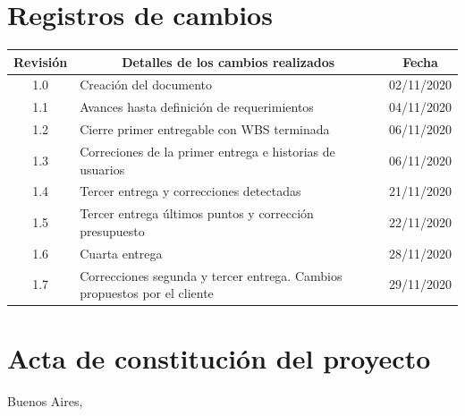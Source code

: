 \documentclass[11pt]{charter}
\begin{document}
\maketitle
\thispagestyle{empty}
\pagebreak


\thispagestyle{empty}
{\setlength{\parskip}{0pt}
\tableofcontents{}
}
\pagebreak


\section{Registros de cambios}
\label{sec:registro}


\begin{table}[ht]
\label{tab:registro}
\centering
\begin{tabularx}{\linewidth}{@{}|c|X|c|@{}}
\hline
\rowcolor[HTML]{C0C0C0} 
Revisión & \multicolumn{1}{c|}{\cellcolor[HTML]{C0C0C0}Detalles de los cambios realizados} & Fecha      \\ \hline
1.0      & Creación del documento                                          & 02/11/2020 \\ \hline
1.1      & Avances hasta definición de requerimientos                                          & 04/11/2020 \\ \hline
1.2      & Cierre primer entregable con WBS terminada
& 06/11/2020 \\ \hline
1.3      & Correciones de la primer entrega e historias de usuarios
& 06/11/2020 \\ \hline
1.4      & Tercer entrega y correcciones detectadas
& 21/11/2020 \\ \hline
1.5      & Tercer entrega últimos puntos y corrección presupuesto
& 22/11/2020 \\ \hline
1.6      & Cuarta entrega
& 28/11/2020 \\ \hline
1.7      & Correcciones segunda y tercer entrega. Cambios propuestos por el cliente
& 29/11/2020 \\ \hline
\end{tabularx}
\end{table}

\pagebreak



\section{Acta de constitución del proyecto}
\label{sec:acta}

\begin{flushright}
Buenos Aires, \fechaInicioName
\end{flushright}
\end{document}
